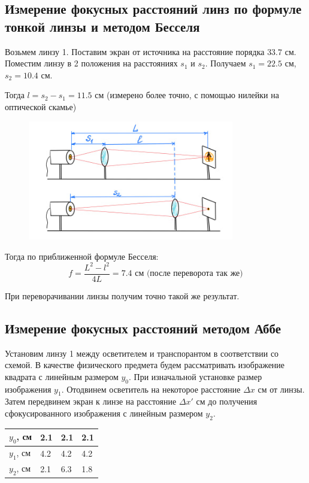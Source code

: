 \documentclass[a4paper,12pt]{article}
\theoremstyle{definition}
\begin{document}
\subsection{Измерение фокусных расстояний линз по формуле тонкой линзы и
методом Бесселя}

Возьмем линзу 1. Поставим экран от источника на расстояние  порядка $33.7$ см.
Поместим линзу в 2 положения на расстояниях $s_1$ и $s_2$. Получаем $s_1 = 22.5$ см, $s_2 = 10.4$ см. 
\par Тогда $l = s_2 - s_1 = 11.5$ см (измерено более точно, с помощью нилейки на оптической скамье)

\begin{figure}[h!]
    \centering
    \includegraphics[width=9cm]{r.jpg}
    \label{fig:vac}
\end{figure}

Тогда по приближенной формуле Бесселя:
\begin{equation*}
    f = \frac{L^2-l^2}{4L} = 7.4 \text{ см (после переворота так же)}
\end{equation*}

При переворачивании линзы получим точно такой же результат.



\subsection{Измерение фокусных расстояний методом Аббе}

Установим линзу 1 между осветителем и транспорантом в соответствии со схемой. В качестве физического предмета будем рассматривать изображение квадрата с линейным размером $y_0$. 
При изначальной установке размер изображения $y_1$. Отодвинем осветитель на некоторое расстояние $\Delta x$ см от линзы. Затем передвинем экран к линзе на расстояние $\Delta x'$ см до 
получения сфокусированного изображения с линейным размером $y_2$.

\begin{table}[h!]
    \centering
    \begin{tabular}{|l|l|l|l|} \hline
    $y_0$, см  & 2.1 & 2.1 & 2.1  \\ \hline
    $y_1$, см  & 4.2 & 4.2 & 4.2  \\ \hline
    $y_2$, см  & 2.1 & 6.3 & 1.8  \\ \hline
    \end{tabular}
\end{table}
\end{document}
